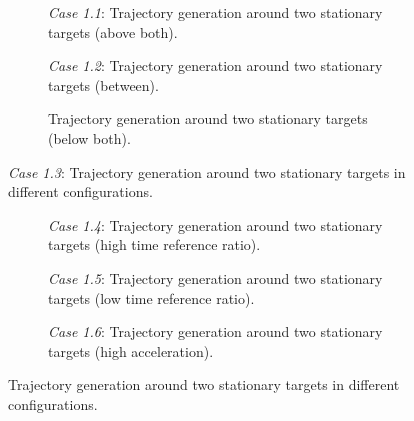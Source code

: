 \begin{figure}
    \centering
    \begin{subfigure}[b]{\textwidth}
        \centering
        
        \caption{\emph{Case 1.1}: Trajectory generation around two stationary targets (above both).}
        \label{fig:stationary-target-2}
    \end{subfigure}
    \hfill
    \begin{subfigure}[b]{\textwidth}
        \centering
        
        \caption{\emph{Case 1.2}: Trajectory generation around two stationary targets (between).}
        \label{fig:stationary-target-3}
    \end{subfigure}
    \hfill
    \begin{subfigure}[b]{\textwidth}
        \centering
        
        \caption{Trajectory generation around two stationary targets (below both).}
        \label{fig:stationary-target-4}
    \end{subfigure}
    \caption{\emph{Case 1.3}: Trajectory generation around two stationary targets in different configurations.}
    \label{fig:stationary-targets-subfigures}
\end{figure}


\begin{figure}
    \centering
    \begin{subfigure}[b]{\textwidth}
        \centering
        
        \caption{\emph{Case 1.4}: Trajectory generation around two stationary targets (high time reference ratio).}
        \label{fig:stationary-target-5}
    \end{subfigure}
    \hfill
    \begin{subfigure}[b]{\textwidth}
        \centering
        
        \caption{\emph{Case 1.5}: Trajectory generation around two stationary targets (low time reference ratio).}
        \label{fig:stationary-target-6}
    \end{subfigure}
    \hfill
    \begin{subfigure}[b]{\textwidth}
        \centering
        
        \caption{\emph{Case 1.6}: Trajectory generation around two stationary targets (high acceleration).}
        \label{fig:stationary-target-7}
    \end{subfigure}
    \caption{Trajectory generation around two stationary targets in different configurations.}
    \label{fig:stationary-targets-subfigures-2}
\end{figure}



